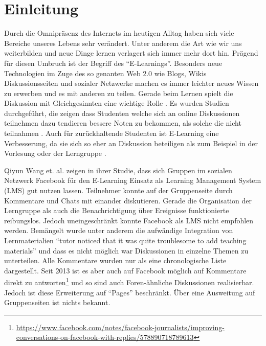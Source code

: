 
\chapter{Einleitung} %
\label{cha:einleitung}





Durch die Omnipräsenz des Internets im heutigen Alltag haben sich viele Bereiche unseres Lebens sehr verändert. Unter anderem die Art wie wir uns weiterbilden und neue Dinge lernen verlagert sich immer mehr dort hin. Prägend für diesen Umbruch ist der Begriff des \enquote{E-Learnings}. Besonders neue Technologien im Zuge des so genanten Web 2.0 wie Blogs, Wikis Diskussionsseiten und sozialer Netzwerke machen es immer leichter neues Wissen zu erwerben und es mit anderen zu teilen. Gerade beim Lernen spielt die Diskussion mit Gleichgesinnten eine wichtige Rolle \cite{Downes2005}. Es wurden Studien durchgeführt, die zeigen dass Studenten welche sich an online Diskussionen teilnehmen dazu tendieren bessere Noten zu bekommen, als solche die nicht teilnahmen \cite{Davies2005,BJET:BJET780}. Auch für zurückhaltende Studenten ist E-Learning eine Verbesserung, da sie sich so eher an Diskussion beteiligen als zum Beispiel in der Vorlesung oder der Lerngruppe \cite{Huang:2009:EPF:1516241.1516267}. 

Qiyun Wang et. al. \cite{Wang2012} zeigen in ihrer Studie, dass sich Gruppen im sozialen Netzwerk Facebook für den E-Learning Einsatz als Learning Management System (LMS) gut nutzen lassen. Teilnehmer konnte auf der Gruppenseite durch Kommentare und Chats mit einander diskutieren. Gerade die Organisation der Lerngruppe als auch die Benachrichtigung über Ereignisse funktionierte reibungslos. Jedoch uneingeschränkt konnte Facebook als LMS nicht empfohlen werden. Bemängelt wurde unter anderem die aufwändige Integration von Lernmaterialien \enquote{tutor noticed that it was quite troublesome to add teaching materials}\cite[S.\,435]{Wang2012} und dass es nicht möglich war Diskussionen in einzelne Themen zu unterteilen. Alle Kommentare wurden nur als eine chronologische Liste dargestellt. Seit 2013 ist es aber auch auf Facebook möglich auf Kommentare direkt zu antworten\footnote{\url{https://www.facebook.com/notes/facebook-journalists/improving-conversations-on-facebook-with-replies/578890718789613}} und so sind auch Foren-ähnliche Diskussionen realisierbar. Jedoch ist diese Erweiterung auf \enquote{Pages} beschränkt. Über eine Ausweitung auf Gruppenseiten ist nichts bekannt. 

